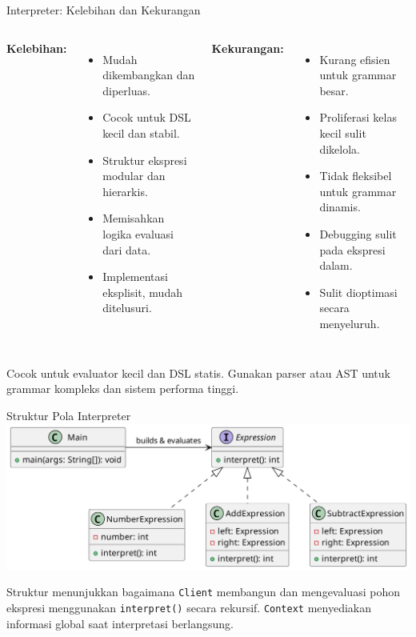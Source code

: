 \documentclass[aspectratio=169, table]{beamer}
\begin{document}
\begin{frame}{Interpreter: Kelebihan dan Kekurangan}
	\vspace{10pt}
	\begin{columns}[T]
		\textbf{Kelebihan:}
		\begin{itemize}
			\item Mudah dikembangkan dan diperluas.
			\item Cocok untuk DSL kecil dan stabil.
			\item Struktur ekspresi modular dan hierarkis.
			\item Memisahkan logika evaluasi dari data.
			\item Implementasi eksplisit, mudah ditelusuri.
		\end{itemize}
		
		\textbf{Kekurangan:}
		\begin{itemize}
			\item Kurang efisien untuk grammar besar.
			\item Proliferasi kelas kecil sulit dikelola.
			\item Tidak fleksibel untuk grammar dinamis.
			\item Debugging sulit pada ekspresi dalam.
			\item Sulit dioptimasi secara menyeluruh.
		\end{itemize}
	\end{columns}
	
	\vspace{6pt}
	\small Cocok untuk evaluator kecil dan DSL statis. Gunakan parser atau AST untuk grammar kompleks dan sistem performa tinggi.
\end{frame}

\begin{frame}{Struktur Pola Interpreter}
	\vspace{10pt}
	\centering
	\includegraphics[width=\textwidth]{../../figures/out/interpreter.png}
	
	\vspace{10pt}
	\small
	Struktur menunjukkan bagaimana \texttt{Client} membangun dan mengevaluasi pohon ekspresi menggunakan \texttt{interpret()} secara rekursif. \texttt{Context} menyediakan informasi global saat interpretasi berlangsung.
\end{frame}
\end{document}
